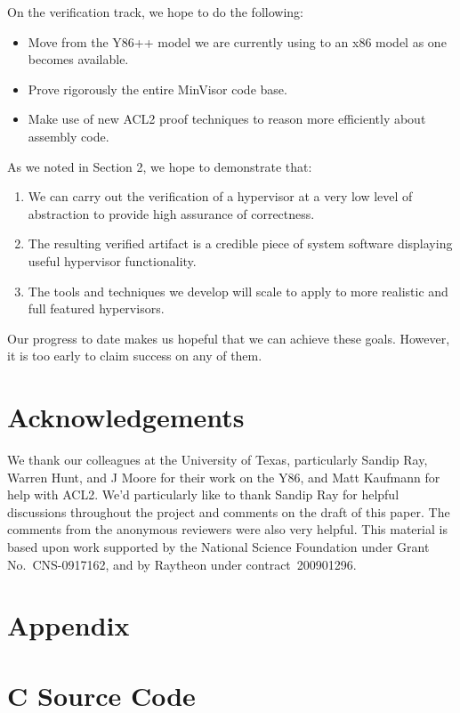 \documentclass[submission,copyright]{eptcs} \providecommand{\event}{ACL2 2011}
\begin{document}
On the verification track, we hope to do the following:
\begin{itemize}
\item Move from the Y86++ model we are currently using to an x86 model
as one becomes available. 

\item Prove rigorously the entire MinVisor code base. 

\item Make use of new ACL2 proof techniques to reason more efficiently
  about assembly code.
\end{itemize}

As we noted in Section 2, we hope to demonstrate that:
\begin{enumerate}
\item We can carry out the verification of a hypervisor at a very low
  level of abstraction to provide high assurance of correctness.
\item The resulting verified artifact is a credible piece of
  system software displaying useful hypervisor functionality.
\item The tools and techniques we develop will scale to apply to
  more realistic and full featured hypervisors. 
\end{enumerate}
Our progress to date makes us hopeful that we can achieve these
goals.  However, it is too early to claim success on any of them. 

\section*{Acknowledgements}
\label{Acknowledgements}

We thank our colleagues at the University of Texas, particularly
Sandip Ray, Warren Hunt, and J Moore for their work on the Y86, and
Matt Kaufmann for help with ACL2.  We'd particularly like to thank
Sandip Ray for helpful discussions throughout the project and comments
on the draft of this paper.  The comments from the anonymous reviewers
were also very helpful. This material is based upon work supported by
the National Science Foundation under Grant No.~CNS-0917162, and by
Raytheon under contract~200901296.

\section*{Appendix}
\appendix
\section{C Source Code}
\end{document}

